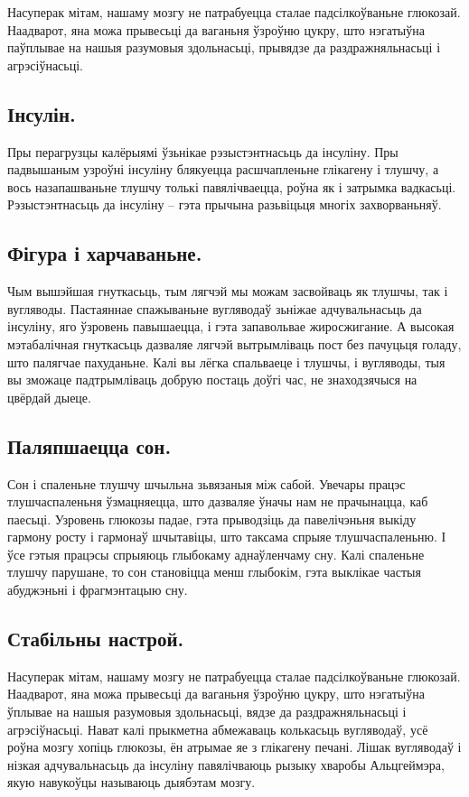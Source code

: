 Насуперак мітам, нашаму мозгу не патрабуецца сталае падсілкоўваньне глюкозай. Наадварот, яна можа прывесьці да ваганьня ўзроўню цукру, што нэгатыўна паўплывае на нашыя разумовыя здольнасьці, прывядзе да раздражняльнасьці і агрэсіўнасьці.

\subsection{Інсулін.}
Пры перагрузцы калёрыямі ўзьнікае рэзыстэнтнасьць да інсуліну. Пры падвышаным узроўні інсуліну блякуецца расшчапленьне глікагену і тлушчу, а вось назапашваньне тлушчу толькі павялічваецца, роўна як і затрымка вадкасьці. Рэзыстэнтнасьць да інсуліну – гэта прычына разьвіцьця многіх захворваньняў.

\subsection{Фігура і харчаваньне.}
Чым вышэйшая гнуткасьць, тым лягчэй мы можам засвойваць як тлушчы, так і вугляводы. Пастаяннае спажываньне вугляводаў зьніжае адчувальнасьць да інсуліну, яго ўзровень павышаецца, і гэта запавольвае жиросжигание. А высокая мэтабалічная гнуткасьць дазваляе лягчэй вытрымліваць пост без пачуцьця голаду, што палягчае пахуданьне. Калі вы лёгка спальваеце і тлушчы, і вугляводы, тыя вы зможаце падтрымліваць добрую постаць доўгі час, не знаходзячыся на цвёрдай дыеце.

\subsection{Паляпшаецца сон.}
Сон і спаленьне тлушчу шчыльна зьвязаныя між сабой. Увечары працэс тлушчаспаленьня ўзмацняецца, што дазваляе ўначы нам не прачынацца, каб паесьці. Узровень глюкозы падае, гэта прыводзіць да павелічэньня выкіду гармону росту і гармонаў шчытавіцы, што таксама спрыяе тлушчаспаленьню. І ўсе гэтыя працэсы спрыяюць глыбокаму аднаўленчаму сну. Калі спаленьне тлушчу парушане, то сон становіцца менш глыбокім, гэта выклікае частыя абуджэньні і фрагмэнтацыю сну.

\subsection{Стабільны настрой.}
Насуперак мітам, нашаму мозгу не патрабуецца сталае падсілкоўваньне глюкозай. Наадварот, яна можа прывесьці да ваганьня ўзроўню цукру, што нэгатыўна ўплывае на нашыя разумовыя здольнасьці, вядзе да раздражняльнасьці і агрэсіўнасьці. Нават калі прыкметна абмежаваць колькасьць вугляводаў, усё роўна мозгу хопіць глюкозы, ён атрымае яе з глікагену печані. Лішак вугляводаў і нізкая адчувальнасьць да інсуліну павялічваюць рызыку хваробы Альцгеймэра, якую навукоўцы называюць дыябэтам мозгу.

